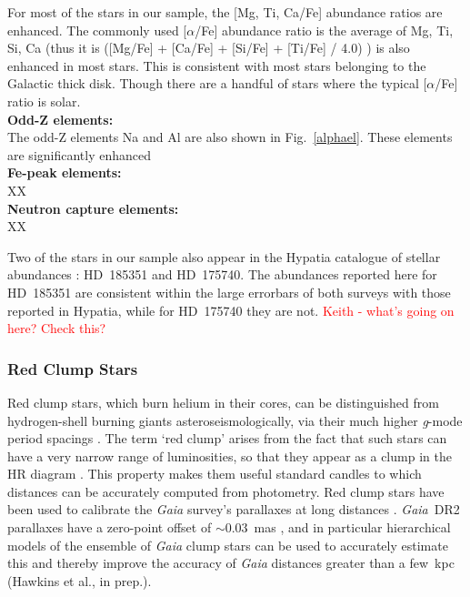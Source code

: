 \documentclass[a4paper,fleqn,usenatbib]{mnras}
\newcommand{\gaia}{\emph{Gaia}\xspace}
\begin{document}
For most of the stars in our sample, the [Mg, Ti, Ca/Fe] abundance ratios are enhanced. The commonly used [$\alpha$/Fe] abundance ratio is the average of Mg, Ti, Si, Ca (thus it is ([Mg/Fe] + [Ca/Fe] + [Si/Fe] + [Ti/Fe] / 4.0) ) is also enhanced in most stars. This is consistent with most stars belonging to the Galactic thick disk. Though there are a handful of stars where the typical [$\alpha$/Fe] ratio is solar. 
\\ 
{\bf Odd-Z elements:}\\
The odd-Z elements Na and Al are also shown in  Fig.~\ref{alphael}. These elements are significantly enhanced 
\\
{\bf Fe-peak elements:}\\
XX
\\ 
{\bf Neutron capture elements:}\\
XX




Two of the stars in our sample also appear in the Hypatia catalogue of stellar abundances \citep{hypatia}: HD~185351 and HD~175740. The abundances reported here for HD~185351 are consistent within the large errorbars of both surveys with those reported in Hypatia, while for HD~175740 they are not. \textcolor{red}{Keith - what's going on here? Check this?}

\subsubsection{Red Clump Stars}
\label{clumpstars}

Red clump stars, which burn helium in their cores, can be distinguished from hydrogen-shell burning giants asteroseismologically, via their much higher \emph{g}-mode period spacings \citep{rggmodehelium}. 
The term `red clump' arises from the fact that such stars can have a very narrow range of luminosities, so that they appear as a clump in the HR diagram \citep{2016ARA&A..54...95G}. This property makes them useful standard candles to which distances can be accurately computed from photometry. Red clump stars have been used to calibrate the \gaia survey's parallaxes at long distances \citep{2017A&A...598L...4D,2017MNRAS.471..722H,2018A&A...609A.116R}. \gaia~DR2 parallaxes have a zero-point offset of $\sim 0.03$~mas \citep{gaiadr2parallax}, and in particular hierarchical models of the ensemble of \gaia clump stars can be used to accurately estimate this and thereby improve the accuracy of \gaia distances greater than a few~kpc (Hawkins et al., in prep.).
\end{document}
